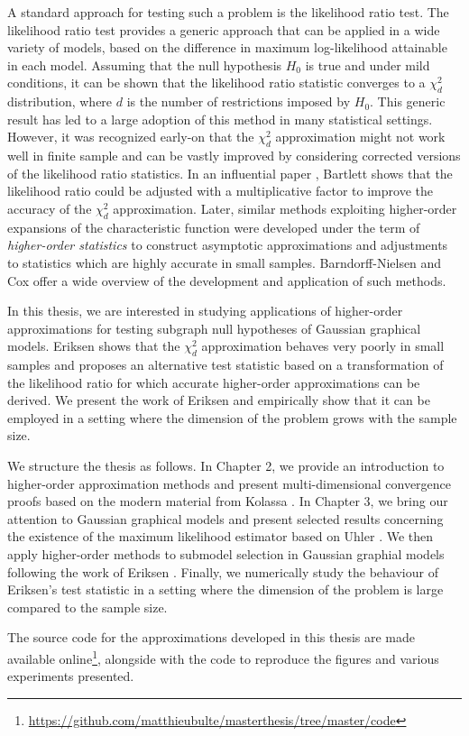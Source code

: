 A standard approach for testing such a problem is the likelihood ratio test. The likelihood ratio test provides a generic approach that can be applied in a wide variety of models, based on the difference in maximum log-likelihood attainable in each model. Assuming that the null  hypothesis $H_0$ is true and under mild conditions, it can be shown that the likelihood ratio statistic converges to a $\chi^2_d$ distribution, where $d$ is the number of restrictions imposed by $H_0$. This generic result has led to a large adoption of this method in many statistical settings. However, it was recognized early-on that the $\chi^2_d$ approximation might not work well in finite sample and can be vastly improved by considering corrected versions of the likelihood ratio statistics. In an influential paper \cite{bartlett1937properties}, Bartlett shows that the likelihood ratio could be adjusted with a multiplicative factor to improve the accuracy of the $\chi^2_d$ approximation. Later, similar methods exploiting higher-order expansions of the characteristic function were developed under the term of \textit{higher-order statistics} to construct asymptotic approximations and adjustments to statistics which are highly accurate in small samples. Barndorff-Nielsen and Cox \cite{barndorff1989asymptotic, cox1994inference} offer a wide overview of the development and application of such methods.

In this thesis, we are interested in studying applications of higher-order approximations for testing subgraph null hypotheses of Gaussian graphical models. Eriksen \cite{eriksen1996tests} shows that the $\chi^2_d$ approximation behaves very poorly in small samples and proposes an alternative test statistic based on a transformation of the likelihood ratio for which accurate higher-order approximations can be derived. We present the work of Eriksen and empirically show that it can be employed in a setting where the dimension of the problem grows with the sample size.

We structure the thesis as follows. In Chapter 2, we provide an introduction to higher-order approximation methods and present multi-dimensional convergence proofs based on the modern material from Kolassa \cite{kolassa2006series}. In Chapter 3, we bring our attention to Gaussian graphical models and present selected results concerning the existence of the maximum likelihood estimator based on Uhler \cite[Chapter 9]{maathuis2018handbook}. We then apply higher-order methods to submodel selection in Gaussian graphial models following the work of Eriksen \cite{eriksen1996tests}. Finally, we numerically study the behaviour of Eriksen's test statistic in a setting where the dimension of the problem is large compared to the sample size.

The source code for the approximations developed in this thesis are made available online\footnote{\url{https://github.com/matthieubulte/masterthesis/tree/master/code}}, alongside with the code to reproduce the figures and various experiments presented.